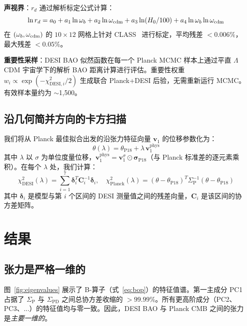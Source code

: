 \documentclass[12pt]{ctexart}
\newcommand{\szero}[0]{\Sigma_{\mathrm{P}}}
\newcommand{\sone}[0]{\Sigma_{\mathrm{PD}}}
\begin{document}
\textbf{声视界}：$r_d$ 通过解析标定公式计算：
\begin{equation}
\ln r_d = a_0 + a_1 \ln \omega_b + a_2 \ln \omega_{\rm cdm} + a_3 \ln(H_0/100) + a_4 \ln \omega_b \ln \omega_{\rm cdm}
\label{eq:rdcal}
\end{equation}
在 $(\omega_b, \omega_{\rm cdm})$ 的 $10 \times 12$ 网格上针对 CLASS~\citep{blas2011, lesgourgues2011} 进行标定，平均残差 $<0.006\%$，最大残差 $<0.05\%$。

\textbf{重要性采样}：DESI BAO 似然函数在每一个 Planck MCMC 样本上通过平直 $\Lambda$CDM 宇宙学下的解析 BAO 距离计算进行评估。重要性权重 $w_i \propto \exp(-\chi^2_{\mathrm{DESI}, i} / 2)$ 生成联合 Planck+DESI 后验，无需重新运行 MCMC。有效样本量约为 $\sim$1,500。

\subsection{沿几何简并方向的卡方扫描}

我们将从 Planck 最佳拟合出发的沿张力特征向量 $\mathbf{v}_1$ 的位移参数化为：
\begin{equation}
\theta(\lambda) = \theta_{\mathrm{P18}} + \lambda \, \mathbf{v}_1^{\mathrm{phys}}
\label{eq:scan}
\end{equation}
其中 $\lambda$ 以 $\sigma$ 为单位度量位移，$\mathbf{v}_1^{\mathrm{phys}} = \mathbf{v}_1^{\sigma} \odot \boldsymbol{\sigma}_{\mathrm{P18}}$（与 Planck 标准差的逐元素乘积）。在每个 $\lambda$ 处，我们计算：
\begin{equation}
\chi^2_{\mathrm{DESI}}(\lambda) = \sum_{i=1}^{7} \boldsymbol{\delta}_i^T \mathbf{C}_i^{-1} \boldsymbol{\delta}_i, \quad
\chi^2_{\mathrm{Planck}}(\lambda) = (\theta - \theta_{\mathrm{P18}})^T \szero^{-1} (\theta - \theta_{\mathrm{P18}})
\label{eq:chisq}
\end{equation}
其中 $\boldsymbol{\delta}_i$ 是模型与第 $i$ 个区间的 DESI 测量值之间的残差向量，$\mathbf{C}_i$ 是该区间的协方差矩阵。

\section{结果}
\label{sec:results}

\subsection{张力是严格一维的}

图~\ref{fig:eigenvalues} 展示了 B-算子（式~\ref{eq:bop}）的特征值谱。第一主成分 PC1 占据了 $\szero$ 与 $\sone$ 之间总协方差收缩的 $>99.99\%$。所有更高阶成分（PC2、PC3、...）的特征值均与零一致。因此，DESI BAO 与 Planck CMB 之间的张力是{\em 主要一维的}。
\end{document}
